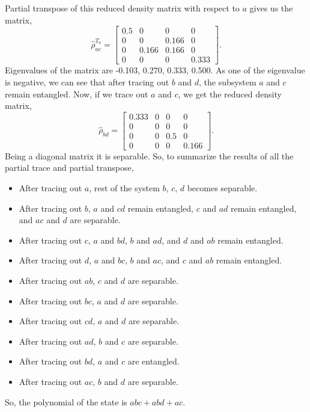 \documentclass{scrartcl}
\begin{document}
Partial transpose of this reduced density matrix with respect to $a$ gives us the matrix,
\begin{equation*}
	\hat{\rho}_{ac}^{T_a} = \left[\begin{matrix}0.5 & 0 & 0 & 0\\0 & 0 & 0.166 & 0\\0 & 0.166 & 0.166 & 0\\0 & 0 & 0 & 0.333\end{matrix}\right].
\end{equation*}
Eigenvalues of the matrix are -0.103, 0.270, 0.333, 0.500. As one of the eigenvalue is negative, we can see that after tracing out $b$ and $d$, the subsystem $a$ and $c$ remain entangled. Now, if we trace out $a$ and $c$, we get the reduced density matrix,
\begin{equation*}
	\hat{\rho}_{bd} = \left[\begin{matrix}0.333 & 0 & 0 & 0\\0 & 0 & 0 & 0\\0 & 0 & 0.5 & 0\\0 & 0 & 0 & 0.166\end{matrix}\right]
	.
\end{equation*}
Being a diagonal matrix it is separable. So, to summarize the results of all the partial trace and partial transpose,
\begin{itemize}
	\item After tracing out $a$, rest of the system $b$, $c$, $d$ becomes separable.
	\item After tracing out $b$, $a$ and $cd$ remain entangled, $c$ and $ad$ remain entangled, and $ac$ and $d$ are separable.
	\item After tracing out $c$, $a$ and $bd$, $b$ and $ad$, and $d$ and $ab$ remain entangled.
	\item After tracing out $d$, $a$ and $bc$, $b$ and $ac$, and $c$ and $ab$ remain entangled.
	\item After tracing out $ab$, $c$ and $d$ are separable.
	\item After tracing out $bc$, $a$ and $d$ are separable.
	\item After tracing out $cd$, $a$ and $d$ are separable.
	\item After tracing out $ad$, $b$ and $c$ are separable.
	\item After tracing out $bd$, $a$ and $c$ are entangled.
	\item After tracing out $ac$, $b$ and $d$ are separable.
\end{itemize}
So, the polynomial of the state is $abc + abd + ac$.
\end{document}
